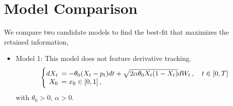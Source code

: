 \documentclass[11pt]{article}
\theoremstyle{definition}
\begin{document}

\section{Model Comparison} \label{Section_5}

We compare two candidate models to find the best-fit that maximizes the retained information,
\begin{itemize}
  \item Model 1: This model does not feature derivative tracking.
\begin{equation}
  \left\{
  \begin{array}{@{}rl@{}}
    dX_t \!\!\!&=  - \theta_0 (X_t - p_t) dt +\sqrt{2 \alpha \theta_0 X_t (1 - X_t)} dW_t\,, \quad t \in [0,T]  \\
   X_0  \!\!\!&=  x_0\in [0,1] \,,
 \end{array}\right.  \label{Model1}
\end{equation}
 with $\theta_0 > 0, \, \alpha > 0$.

%  


\end{itemize}
\end{document}
